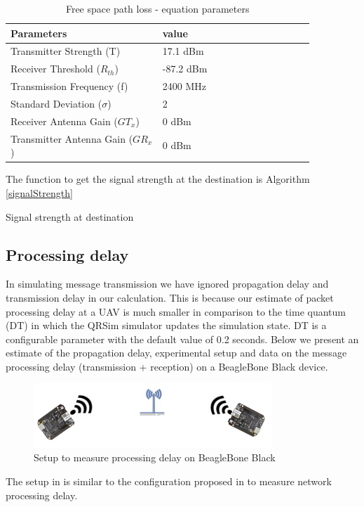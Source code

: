 \begin{table}
\caption{Free space path loss - equation parameters}
\label{tab:fspl_parameters}
\begin{tabular}{|p{0.43\linewidth}|p{0.43\linewidth}|}
\toprule
Parameters & value \cite{wilink}\\
\midrule
Transmitter Strength (T) & 17.1  dBm \\
\midrule
Receiver Threshold ($R_{th}$)	& -87.2 dBm  \\
\midrule
Transmission Frequency (f) & 2400 MHz \\
\midrule
Standard Deviation ($\sigma$) & 2\\
\midrule
Receiver Antenna Gain ($GT_x$) & 0 dBm\\
\midrule
Transmitter Antenna Gain ($GR_x$) & 0 dBm \\
\bottomrule
\end{tabular}
\end{table}


The function to get the signal strength at the destination is Algorithm \ref{signalStrength}
\begin{algorithm}
\caption{Signal strength at destination}
\label{signalStrength}
\DontPrintSemicolon
{}


\end{algorithm} 


\subsection{Processing delay}

In simulating message transmission we have ignored propagation delay and transmission delay in our calculation. This is because our estimate of packet processing delay at a UAV is much smaller in comparison to the time quantum (DT) in which the QRSim simulator updates the simulation state. DT is a configurable parameter with the default value of 0.2 seconds. Below we present an estimate of the propagation delay, experimental setup and data on the message processing delay (transmission + reception) on a BeagleBone Black device.
\begin{figure}[hbtp]
\centering
\includegraphics[width=0.8\textwidth]{Chapter-4/figs/beaglebone}
\caption{Setup to measure processing delay on BeagleBone Black}
\label{fig:proc_delay_setup}
\end{figure}
The setup in  is similar to the configuration proposed in \cite{1378257} to measure network processing delay.

